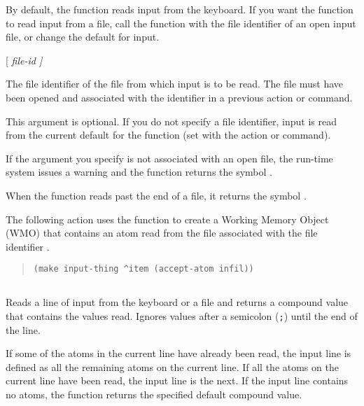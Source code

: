 By default, the  function reads input from the
keyboard. If you want the function to read input from a file, call the
function with the file identifier of an open input file, or change the
default for input.

\Format

 [ \it{file-id} ]

\begin{arguments}
\item[file-id]

  The file identifier of the file from which input is to be read. The
  file must have been opened and associated with the identifier in a
  previous  action or command.

  This argument is optional. If you do not specify a file identifier,
  input is read from the current default for the 
  function (set with the  action or command).
\end{arguments}

\ReturnValue

If the argument you specify is not associated with an open file, the
run-time system issues a warning and the function returns the symbol
.

When the function reads past the end of a file, it returns the symbol
.

\Example

The following  action uses the  function to
create a Working Memory Object (WMO) that contains an atom read from
the file associated with the file identifier .

\begin{quote}
\begin{verbatim}
(make input-thing ^item (accept-atom infil))
\end{verbatim}
\end{quote}

\subsection{}

Reads a line of input from the keyboard or a file and returns a
compound value that contains the values read. Ignores values after a
semicolon (\verb|;|) until the end of the line.

If some of the atoms in the current line have already been read, the
input line is defined as all the remaining atoms on the current
line. If all the atoms on the current line have been read, the input
line is the next. If the input line contains no atoms, the function
returns the specified default compound value.

